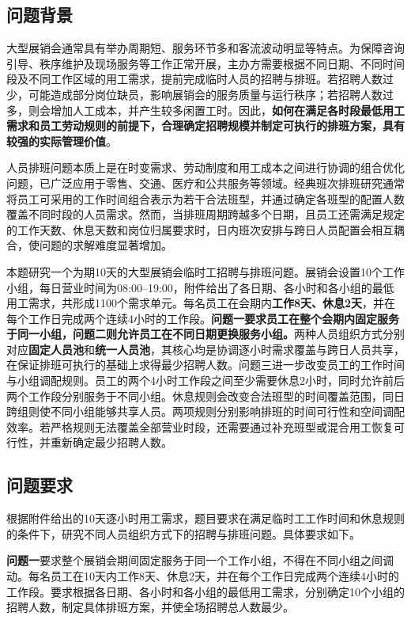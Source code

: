 \documentclass[withoutpreface,bwprint]{cumcmthesis}
\begin{document}
\subsection{问题背景}

大型展销会通常具有举办周期短、服务环节多和客流波动明显等特点。为保障咨询引导、秩序维护及现场服务等工作正常开展，主办方需要根据不同日期、不同时间段及不同工作区域的用工需求，提前完成临时人员的招聘与排班。若招聘人数过少，可能造成部分岗位缺员，影响展销会的服务质量与运行秩序；若招聘人数过多，则会增加人工成本，并产生较多闲置工时。因此，\textbf{如何在满足各时段最低用工需求和员工劳动规则的前提下，合理确定招聘规模并制定可执行的排班方案，具有较强的实际管理价值}。

人员排班问题本质上是在时变需求、劳动制度和用工成本之间进行协调的组合优化问题，已广泛应用于零售、交通、医疗和公共服务等领域\cite{ernst2004,vandenbergh2013personnel}。经典班次排班研究通常将员工可采用的工作时间组合表示为若干合法班型，并通过确定各班型的配置人数覆盖不同时段的人员需求\cite{dantzig1954comment}。然而，当排班周期跨越多个日期，且员工还需满足规定的工作天数、休息天数和岗位归属要求时，日内班次安排与跨日人员配置会相互耦合，使问题的求解难度显著增加。

本题研究一个为期10天的大型展销会临时工招聘与排班问题。展销会设置10个工作小组，每日营业时间为08:00--19:00，附件给出了各日期、各小时和各小组的最低用工需求，共形成1100个需求单元。每名员工在会期内\textbf{工作8天、休息2天}，并在每个工作日完成两个连续4小时的工作段。\textbf{问题一要求员工在整个会期内固定服务于同一小组，问题二则允许员工在不同日期更换服务小组。}两种人员组织方式分别对应\textbf{固定人员池}和\textbf{统一人员池}，其核心均是协调逐小时需求覆盖与跨日人员共享，在保证排班可执行的基础上求得最少招聘人数。问题三进一步改变员工的工作时间与小组调配规则。员工的两个4小时工作段之间至少需要休息2小时，同时允许前后两个工作段分别服务于不同小组。休息规则会改变合法班型的时间覆盖范围，同日跨组则使不同小组能够共享人员。两项规则分别影响排班的时间可行性和空间调配效率。若严格规则无法覆盖全部营业时段，还需要通过补充班型或混合用工恢复可行性，并重新确定最少招聘人数。


\subsection{问题要求}

根据附件给出的10天逐小时用工需求，题目要求在满足临时工工作时间和休息规则的条件下，研究不同人员组织方式下的招聘与排班问题。具体要求如下。

\textbf{问题一}要求整个展销会期间固定服务于同一个工作小组，不得在不同小组之间调动。每名员工在10天内工作8天、休息2天，并在每个工作日完成两个连续4小时的工作段。要求根据各日期、各小时和各小组的最低用工需求，分别确定10个小组的招聘人数，制定具体排班方案，并使全场招聘总人数最少。
\end{document}
